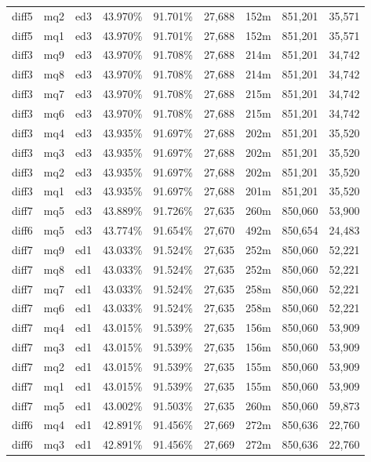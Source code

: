 \begin{landscape}
\begin{longtable}{|c|c|c||c|c||c|c|c|c|}
diff5 & mq2 & ed3 & 43.970\% & 91.701\% & 27,688 & 152m & 851,201 & 35,571 \\
diff5 & mq1 & ed3 & 43.970\% & 91.701\% & 27,688 & 152m & 851,201 & 35,571 \\
diff3 & mq9 & ed3 & 43.970\% & 91.708\% & 27,688 & 214m & 851,201 & 34,742 \\
diff3 & mq8 & ed3 & 43.970\% & 91.708\% & 27,688 & 214m & 851,201 & 34,742 \\
diff3 & mq7 & ed3 & 43.970\% & 91.708\% & 27,688 & 215m & 851,201 & 34,742 \\
diff3 & mq6 & ed3 & 43.970\% & 91.708\% & 27,688 & 215m & 851,201 & 34,742 \\
diff3 & mq4 & ed3 & 43.935\% & 91.697\% & 27,688 & 202m & 851,201 & 35,520 \\
diff3 & mq3 & ed3 & 43.935\% & 91.697\% & 27,688 & 202m & 851,201 & 35,520 \\
diff3 & mq2 & ed3 & 43.935\% & 91.697\% & 27,688 & 202m & 851,201 & 35,520 \\
diff3 & mq1 & ed3 & 43.935\% & 91.697\% & 27,688 & 201m & 851,201 & 35,520 \\
diff7 & mq5 & ed3 & 43.889\% & 91.726\% & 27,635 & 260m & 850,060 & 53,900 \\
diff6 & mq5 & ed3 & 43.774\% & 91.654\% & 27,670 & 492m & 850,654 & 24,483 \\
diff7 & mq9 & ed1 & 43.033\% & 91.524\% & 27,635 & 252m & 850,060 & 52,221 \\
diff7 & mq8 & ed1 & 43.033\% & 91.524\% & 27,635 & 252m & 850,060 & 52,221 \\
diff7 & mq7 & ed1 & 43.033\% & 91.524\% & 27,635 & 258m & 850,060 & 52,221 \\
diff7 & mq6 & ed1 & 43.033\% & 91.524\% & 27,635 & 258m & 850,060 & 52,221 \\
diff7 & mq4 & ed1 & 43.015\% & 91.539\% & 27,635 & 156m & 850,060 & 53,909 \\
diff7 & mq3 & ed1 & 43.015\% & 91.539\% & 27,635 & 156m & 850,060 & 53,909 \\
diff7 & mq2 & ed1 & 43.015\% & 91.539\% & 27,635 & 155m & 850,060 & 53,909 \\
diff7 & mq1 & ed1 & 43.015\% & 91.539\% & 27,635 & 155m & 850,060 & 53,909 \\
diff7 & mq5 & ed1 & 43.002\% & 91.503\% & 27,635 & 260m & 850,060 & 59,873 \\
diff6 & mq4 & ed1 & 42.891\% & 91.456\% & 27,669 & 272m & 850,636 & 22,760 \\
diff6 & mq3 & ed1 & 42.891\% & 91.456\% & 27,669 & 272m & 850,636 & 22,760 \\

\end{longtable}
\end{landscape}
